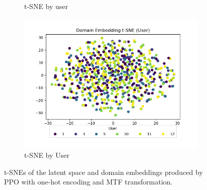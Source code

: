 \begin{figure}
\begin{subfigure}{0.3\textwidth}
		\caption{t-SNE by user}
		\label{fig:mtf-ppo-one-ls-user}
	\end{subfigure}
	\hfill
	\begin{subfigure}{0.3\textwidth}
		\centering
		\includegraphics[width=\textwidth]{figures/mtf-ppo-one/de-user}
		\caption{t-SNE by User}
		\label{fig:mtf-ppo-one-de-user}
	\end{subfigure}
	\caption{t-SNEs of the latent space and domain embeddings produced by PPO with one-hot encoding and MTF transformation.}
	\label{fig:mtf-ppo-one}
\end{figure}
